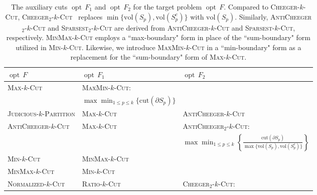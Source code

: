 \documentclass[12pt, a4paper]{article}%
\DeclareMathOperator*{\opt}{\ensuremath{opt}}
\newcommand{\cut}{\mathrm{cut}}
\newcommand{\vol}{\mathrm{vol}}
\numberwithin{equation}{section}
\theoremstyle{plain}
\begin{document}
			\begin{table}[htbp]
				\centering
				\caption[Auxiliary cuts]{The auxiliary cuts  $\opt\,F_1$ and $\opt\,F_2$ for the target problem $\opt\,F$. Compared to \textsc{Cheeger}-$k$-\textsc{Cut}, 	\textsc{Cheeger}$_2$-$k$-\textsc{Cut}~\cite{lee2014multiway} replaces  $\min\{\vol(S_p),\vol(S_p^c)\}$ with $\vol(S_p)$. Similarly, 	\textsc{AntiCheeger}$_2$-$k$-\textsc{Cut} and 	\textsc{Sparsest}$_2$-$k$-\textsc{Cut} are derived from \textsc{AntiCheeger}-$k$-\textsc{Cut} and \textsc{Sparsest}-$k$-\textsc{Cut}, respectively. \textsc{MinMax}-$k$-\textsc{Cut} employs a ``max-boundary" form in place of the ``sum-boundary" form utilized in  \textsc{Min}-$k$-\textsc{Cut}. Likewise, we introduce  \textsc{MaxMin}-$k$-\textsc{Cut} in a ``min-boundary" form as a replacement for the ``sum-boundary" form of \textsc{Max}-$k$-\textsc{Cut}.}
				\label{tab::cut-combine}
				\begin{tabular}{|lll|}
					\hline
					$\opt\, F$                                  &  $\opt\,F_1$ & $\opt\,F_2$                    \\ \hline
					\multirow{2}{*}{\textsc{Max}-$k$-\textsc{Cut}}          & \textsc{MaxMin}-$k$-\textsc{Cut}:                & \multirow{2}{*}{}        \\
					& $\max \min_{1\leq p\leq k} \{\cut(\partial S_p)\}$ &                          \\ \hline
					\textsc{Judicious}-$k$-\textsc{Partition}               & \textsc{Max}-$k$-\textsc{Cut}                    & \textsc{AntiCheeger}-$k$-\textsc{Cut}     \\ \hline
					\multirow{2}{*}{\textsc{AntiCheeger}-$k$-\textsc{Cut}} & \multirow{2}{*}{\textsc{Max}-$k$-\textsc{Cut}}   & 	\textsc{AntiCheeger}$_2$-$k$-\textsc{Cut}: \\
					&                                & $\max\min_{1\leq p\leq k}\left\{\frac{\cut(\partial S_p)}{\max\{\vol(S_p),\vol(S_p^c)\}}\right\}$                        \\ \hline
					\textsc{Min}-$k$-\textsc{Cut}                           & \textsc{MinMax}-$k$-\textsc{Cut}                &                          \\ \hline
					\textsc{MinMax}-$k$-\textsc{Cut}                       & \textsc{Min}-$k$-\textsc{Cut}                    &                          \\ \hline
					\multirow{2}{*}{\textsc{Normalized}-$k$-\textsc{Cut}}   & \multirow{2}{*}{\textsc{Ratio}-$k$-\textsc{Cut}} & 	\textsc{Cheeger}$_2$-$k$-\textsc{Cut}:      \\

\end{tabular}
\end{table}
\end{document}
